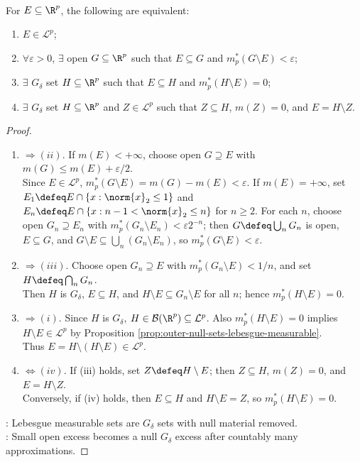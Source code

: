 \begin{theorem} \label{thm:open-gdelta-characterization-lebesgue-measurable} \\
For $E\subseteq\R^p$, the following are equivalent:
\begin{enumerate}[label=(\roman*)]
\setlength{\itemsep}{0pt}
\item $E\in\mathcal{L}^p$;
\item $\forall\varepsilon>0$, $\exists$ open $G\subseteq\R^p$ such that $E\subseteq G$ and $m_p^\ast(G\setminus E)<\varepsilon$;
\item $\exists$ $G_\delta$ set $H\subseteq\R^p$ such that $E\subseteq H$ and $m_p^\ast(H\setminus E)=0$;
\item $\exists$ $G_\delta$ set $H\subseteq\R^p$ and $Z\in\mathcal{L}^p$ such that $Z\subseteq H$, $m(Z)=0$, and $E=H\setminus Z$.
\end{enumerate}
\begin{proof}
\begin{enumerate}[label=(\roman*)]
\setlength{\itemsep}{0pt}
\item[$(i)$]$\Rightarrow (ii)$. If $m(E)<+\infty$, choose open $G\supseteq E$ with $m(G)\leq m(E)+\varepsilon/2$.\\
Since $E\in\mathcal{L}^p$, $m_p^\ast(G\setminus E)=m(G)-m(E)<\varepsilon$. If $m(E)=+\infty$, set $E_1\defeq E\cap\{x:\norm{x}_2\leq1\}$ and $E_n\defeq E\cap\{x:n-1<\norm{x}_2\leq n\}$ for $n\geq2$. For each $n$, choose open $G_n\supseteq E_n$ with $m_p^\ast(G_n\setminus E_n)<\varepsilon2^{-n}$; then $G\defeq\bigcup_nG_n$ is open, $E\subseteq G$, and $G\setminus E\subseteq\bigcup_n(G_n\setminus E_n)$, so $m_p^\ast(G\setminus E)<\varepsilon$.
\item[$(ii)$]$\Rightarrow (iii)$. Choose open $G_n\supseteq E$ with $m_p^\ast(G_n\setminus E)<1/n$, and set $H\defeq\bigcap_nG_n$.\\
Then $H$ is $G_\delta$, $E\subseteq H$, and $H\setminus E\subseteq G_n\setminus E$ for all $n$; hence $m_p^\ast(H\setminus E)=0$.
\item[$(iii)$]$\Rightarrow (i)$. Since $H$ is $G_\delta$, $H\in\mathcal{B}(\R^p)\subseteq\mathcal{L}^p$. Also $m_p^\ast(H\setminus E)=0$ implies $H\setminus E\in\mathcal{L}^p$ by Proposition \ref{prop:outer-null-sets-lebesgue-measurable}.\\ Thus $E=H\setminus(H\setminus E)\in\mathcal{L}^p$.
\item[$(iii)$]$\Leftrightarrow (iv)$. If (iii) holds, set $Z\defeq H\setminus E$; then $Z\subseteq H$, $m(Z)=0$, and $E=H\setminus Z$.\\
Conversely, if (iv) holds, then $E\subseteq H$ and $H\setminus E=Z$, so $m_p^\ast(H\setminus E)=0$.
\end{enumerate}
: Lebesgue measurable sets are $G_\delta$ sets with null material removed.\\
: Small open excess becomes a null $G_\delta$ excess after countably many approximations.
\end{proof}
\end{theorem}

